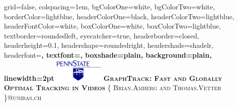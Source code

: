 \documentclass[landscape,final,a0paper,fontscale=0.285]{baposter}
\begin{document}



\begin{poster}%
  {
  grid=false,
  colspacing=1em,
  bgColorOne=white,
  bgColorTwo=white,
  borderColor=lightblue,
  headerColorOne=black,
  headerColorTwo=lightblue,
  headerFontColor=white,
  boxColorOne=white,
  boxColorTwo=lightblue,
  textborder=roundedleft,
  eyecatcher=true,
  headerborder=closed,
  headerheight=0.1\textheight,
  headershape=roundedright,
  headershade=shadelr,
  headerfont=\Large\bf\textsc, %
  textfont={\setlength{\parindent}{1.5em}},
  boxshade=plain,
  background=plain,
  linewidth=2pt
  }
  {\includegraphics[height=3em]{images/psulogo.png}} 
  {\bf\textsc{GraphTrack: Fast and Globally Optimal Tracking in Videos}\vspace{0.5em}}
  {\textsc{\{ Brian.Amberg and Thomas.Vetter \}@unibas.ch}}
  {%
  }

    \newcommand{\colouredcircle}{%
      \tikz{\useasboundingbox (-0.2em,-0.32em) rectangle(0.2em,0.32em); \draw[draw=black,fill=lightblue,line width=0.03em] (0,0) circle(0.18em);}}


\end{poster}
\end{document}
